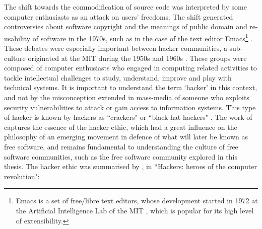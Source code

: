 The shift towards the commodification of source code was interpreted by some computer enthusiasts as an attack on users' freedoms. The shift generated controversies about software copyright and the meanings of public domain and re-usability of software in the 1970s, such as in the case of the text editor Emacs\footnote{Emacs is a set of free/libre text editors, whose development started in 1972 at the Artificial Intelligence Lab of the MIT \parencite{emacs:Online}, which is popular for its high level of extensibility.} \parencite[189-209]{kelty2008two}. These debates were especially important between hacker communities, a sub-culture originated at the MIT during the 1950s and 1960s \parencite{levy1984hackers}. These groups were composed of computer enthusiasts who engaged in computing related activities to tackle intellectual challenges to study, understand, improve and play with technical systems. It is important to understand the term `hacker' in this context, and not by the misconception extended in mass-media of someone who exploits security vulnerabilities to attack or gain access to information systems. This type of hacker is known by hackers as ``crackers" or ``black hat hackers" \parencite[17-25]{holt2013hackers}. The work of \textcite{levy1984hackers} captures the essence of the hacker ethic, which had a great influence on the philosophy of an emerging movement in defence of what will later be known as free software, and remains fundamental to understanding the culture of free software communities, such as the free software community explored in this thesis. The hacker ethic was summarised by \textcite[26--36]{levy1984hackers}, in ``Hackers: heroes of the computer revolution":

